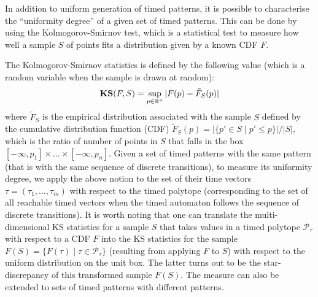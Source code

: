 In addition to uniform generation of timed patterns, it is possible to characterise the ``uniformity degree'' of a given set of timed patterns. This can be done by using the Kolmogorov-Smirnov test, which is a statistical test to measure how well a sample $S$ of points fits a distribution given by a known CDF $F$. %

The Kolmogorov-Smirnov statistics is defined by the following value (which is a random variable when the sample is drawn at random):
$$\mathbf{KS}(F,S)=\sup_{p\in\mathbb{R}^n}|F(p)-\tilde F_S(p)|$$
where $\tilde F_S$ is the empirical distribution associated with the sample $S$ defined by the cumulative distribution function (CDF) 
$\tilde F_S(p)=|\{p'\in S\mid  p'\leq p\}|/|S|,$ which is the ratio of number of points in $S$ that falls in the box $[-\infty, p_1]\times \ldots\times [-\infty, p_n].$ 
Given a set of timed patterns with the same pattern (that is with the same sequence of discrete transitions), to measure its uniformity degree, we apply the above notion to the set of their time vectors $\tau = (\tau_1, \ldots, \tau_m)$ with respect to the timed polytope (corresponding to the set of all reachable timed vectors when the timed automaton follows the sequence of discrete transitions). It is worth noting that one can translate the multi-dimensional KS statistics for a sample $S$ that takes values in a timed polytope $\mathcal{P}_{\tau}$ with respect to a CDF $F$  into the KS statistics for the sample $F(S)=\{F(\tau)\mid  \tau \in \mathcal{P}_{\tau}\}$ (resulting from applying $F$ to $S$) with respect to the uniform distribution on the unit box. The latter turns out to be the star-discrepancy of this transformed sample $F(S)$. The measure can also be extended to sets of timed patterns  with different patterns.

